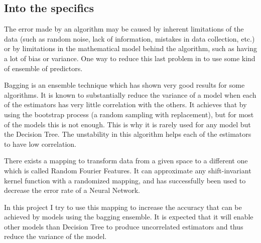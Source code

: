 \documentclass{article}
\begin{document}
    \subsection{Into the specifics}
    The error made by an algorithm may be caused by inherent limitations of the
    data (such as random noise, lack of information, mistakes in data
    collection, etc.) or by limitations in the mathematical model behind the
    algorithm, such as having a lot of bias or variance. One way to reduce this
    last problem in to use some kind of ensemble of predictors.

    Bagging is an ensemble technique which has shown very good results for
    some algorithms. It is known to substantially reduce the variance of a model when each of the estimators has very little correlation with the others. It
    achieves that by using the bootstrap process (a random sampling with
    replacement), but for most of the models this is not enough. This is why it is rarely used for any model but the Decision Tree. The unstability in this
    algorithm helps each of the estimators to have low correlation.

    There exists a mapping to transform data from a given space to a different one which is called Random Fourier Features. It can approximate any
    shift-invariant kernel function with a randomized mapping, and has successfully
    been used to decrease the error rate of a Neural Network.

    In this project I try to use this mapping to increase the accuracy that can
    be achieved by models using the bagging ensemble. It is expected that it will
    enable other models than Decision Tree to produce uncorrelated estimators and
    thus reduce the variance of the model.
\end{document}
